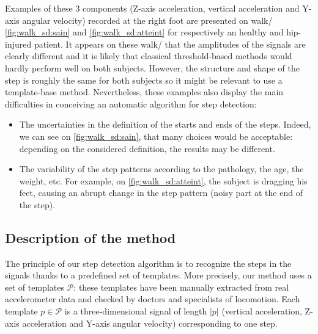 \documentclass[../thesis.tex]{subfiles}
\begin{document}
Examples of these 3 components (Z-axis acceleration, vertical acceleration and Y-axis angular velocity) recorded at the right foot are presented on walk/ \autoref{fig:walk_sd:sain} and \autoref{fig:walk_sd:atteint} for respectively an healthy and hip-injured patient. It appears on these walk/ that the amplitudes of the signals are clearly different and it is likely that classical threshold-based methods would hardly perform well on both subjects. However, the structure and shape of the step is roughly the same for both subjects so it might be relevant to use a template-base method. Nevertheless, these examples also display the main difficulties in conceiving an automatic algorithm for step detection:
\begin{itemize}
 \item The uncertainties in the definition of the starts and ends of the steps. Indeed, we can see on \autoref{fig:walk_sd:sain}, that many choices would be acceptable: depending on the considered definition, the results may be different. 
\item The variability of the step patterns according to the pathology, the age, the weight, etc. For example, on \autoref{fig:walk_sd:atteint}, the subject is dragging his feet, causing an abrupt change in the step pattern (noisy part at the end of the step).
\end{itemize}










\subsection{Description of the method}



The principle of our step detection algorithm is to recognize the steps in the signals thanks to a predefined set of templates. More precisely, our method uses a set of templates  $\mathcal{P}$: these templates have been manually extracted from real accelerometer data and checked by doctors and specialists of locomotion.  Each template $p\in\mathcal{P}$ is a three-dimensional signal of length $|p|$ (vertical acceleration, Z-axis acceleration and Y-axis angular velocity) corresponding to one step.
\end{document}
